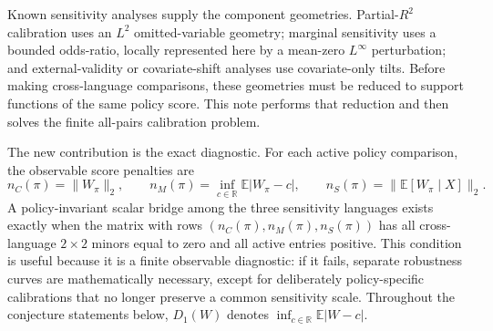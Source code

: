\documentclass[11pt]{article}
\newcommand{\E}{\mathbb{E}}
\newcommand{\R}{\mathbb{R}}
\theoremstyle{definition}
\theoremstyle{plain}
\theoremstyle{remark}
\begin{document}
Known sensitivity analyses supply the component geometries.  Partial-$R^2$ calibration
uses an $L^2$ omitted-variable geometry; marginal sensitivity uses a bounded
odds-ratio, locally represented here by a mean-zero $L^\infty$ perturbation; and
external-validity or covariate-shift analyses use covariate-only tilts.  Before making
cross-language comparisons, these geometries must be reduced to support functions of
the same policy score.  This note performs that reduction and then solves the finite
all-pairs calibration problem.

The new contribution is the exact diagnostic.  For each active policy comparison, the
observable score penalties are
\[
  n_C(\pi)=\|W_\pi\|_2,\qquad
  n_M(\pi)=\inf_{c\in\R}\E|W_\pi-c|,\qquad
  n_S(\pi)=\|\E[W_\pi\mid X]\|_2.
\]
A policy-invariant scalar bridge among the three sensitivity languages exists exactly
when the matrix with rows $(n_C(\pi),n_M(\pi),n_S(\pi))$ has all cross-language
$2\times2$ minors equal to zero and all active entries positive.  This condition is
useful because it is a finite observable diagnostic: if it fails, separate robustness
curves are mathematically necessary, except for deliberately policy-specific
calibrations that no longer preserve a common sensitivity scale.
Throughout the conjecture statements below, $D_1(W)$ denotes
$\inf_{c\in\R}\E|W-c|$.
\end{document}
